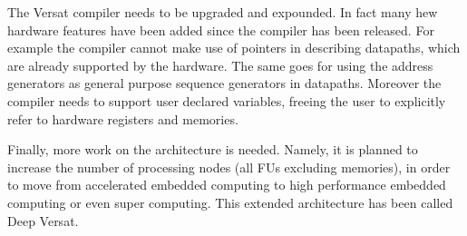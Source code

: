 The Versat compiler needs to be upgraded and expounded. In fact many
hew hardware features have been added since the compiler has been
released. For example the compiler cannot make use of pointers in
describing datapaths, which are already supported by the hardware. The
same goes for using the address generators as general purpose sequence
generators in datapaths. Moreover the compiler needs to support user
declared variables, freeing the user to explicitly refer to hardware
registers and memories.

Finally, more work on the architecture is needed. Namely, it is
planned to increase the number of processing nodes (all FUs excluding
memories), in order to move from accelerated embedded computing to
high performance embedded computing or even super computing. This
extended architecture has been called Deep Versat.

